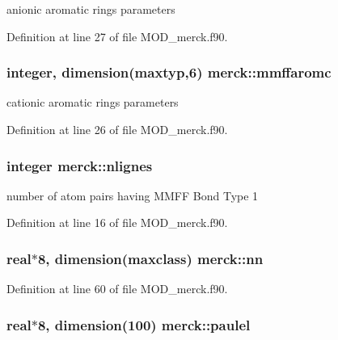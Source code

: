 anionic aromatic rings parameters 



Definition at line 27 of file M\-O\-D\-\_\-merck.\-f90.

\hypertarget{classmerck_a7c40e12504115bebc849894e41dabcec}{
\subsubsection[{mmffaromc}]{\setlength{\rightskip}{0pt plus 5cm}integer, dimension(maxtyp,6) merck\-::mmffaromc}}\label{classmerck_a7c40e12504115bebc849894e41dabcec}


cationic aromatic rings parameters 



Definition at line 26 of file M\-O\-D\-\_\-merck.\-f90.

\hypertarget{classmerck_acec340287dd736c720d96b5328c4d2c9}{
\subsubsection[{nlignes}]{\setlength{\rightskip}{0pt plus 5cm}integer merck\-::nlignes}}\label{classmerck_acec340287dd736c720d96b5328c4d2c9}


number of atom pairs having M\-M\-F\-F Bond Type 1 



Definition at line 16 of file M\-O\-D\-\_\-merck.\-f90.

\hypertarget{classmerck_a7ae1bbbe81c44501bf843c48a81ef02f}{
\subsubsection[{nn}]{\setlength{\rightskip}{0pt plus 5cm}real$\ast$8, dimension(maxclass) merck\-::nn}}\label{classmerck_a7ae1bbbe81c44501bf843c48a81ef02f}


Definition at line 60 of file M\-O\-D\-\_\-merck.\-f90.

\hypertarget{classmerck_ad13da23eb43bf51f1ba2c113f2b808ba}{
\subsubsection[{paulel}]{\setlength{\rightskip}{0pt plus 5cm}real$\ast$8, dimension(100) merck\-::paulel}}\label{classmerck_ad13da23eb43bf51f1ba2c113f2b808ba}


